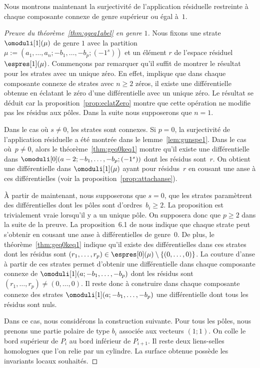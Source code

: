 Nous montrons maintenant la surjectivité de l'application résiduelle restreinte à chaque composante connexe de genre supérieur ou égal à~$1$.
\begin{proof}[Preuve du théorème~\ref{thm:ggeq1abel} en genre $1$]
Nous fixons une strate $\omoduli[1](\mu)$ de genre $1$ avec la partition $\mu:=(a_{1},\dots,a_{n};-b_{1},\dots,-b_{p};(-1^{s}))$ et un élément $r$ de l'espace résiduel $\espres[1](\mu)$.
Commençons par remarquer qu'il suffit de montrer le résultat pour les strates avec un unique zéro. En effet, \cite[Prop.\,7.1]{Bo} implique que dans chaque composante connexe de strates avec $n\geq2$ zéros, il existe une différentielle obtenue en éclatant le zéro d'une différentielle avec un unique zéro. Le résultat se déduit car la proposition~\ref{prop:eclatZero} montre que cette opération ne modifie pas les résidus aux pôles. Dans la suite nous supposerons que $n=1$.

Dans le cas où $s\neq0$, les strates sont connexes. Si $p = 0$, la surjectivité de l'application résiduelle a été montrée dans le lemme~\ref{lem:gunspe1}.
Dans le cas où~$p\neq0$, alors le théorème~\ref{thm:geq0keq1} montre qu'il existe une différentielle dans $\omoduli[0](a-2;-b_{1},\dots,-b_{p};(-1^{s}))$ dont les résidus sont~$r$. On obtient une différentielle dans $\omoduli[1](\mu)$ ayant pour résidus~$r$ en cousant une anse à ces différentielles (voir la proposition~\ref{prop:attachanse}).

À partir de maintenant, nous supposerons que $s=0$, \ie que les strates paramètrent des différentielles dont les pôles sont d'ordres~$b_{i}\geq 2$. La proposition est trivialement vraie lorsqu'il y a un unique pôle. On supposera donc que $p\geq2$ dans la suite de la preuve. La proposition~6.1 de \cite{Bo} nous indique que chaque strate peut s'obtenir en cousant une anse à différentielles de genre~$0$. De plus, le théorème~\ref{thm:geq0keq1} indique qu'il existe des différentielles dans ces strates dont les résidus sont $(r_{1},\dots,r_{p})\in \espres[0](\mu)\setminus\left\{(0,\dots,0)\right\}$. La couture d'anse à partir de ces strates permet d'obtenir une différentielle dans chaque composante connexe de $\omoduli[1](a;-b_{1},\dots,-b_{p})$ dont les résidus sont $(r_{1},\dots,r_{p}) \neq (0,\dots,0)$. Il reste donc à construire dans chaque composante connexe des strates $\omoduli[1](a;-b_{1},\dots,-b_{p})$ une différentielle dont tous les résidus sont nuls.

Dans ce cas, nous considérons la construction suivante. Pour tous les pôles, nous prenons une partie polaire de type $b_{i}$ associée aux vecteurs $(1;1)$. On colle le bord supérieur de $P_{i}$ au bord inférieur de $P_{i+1}$.
Il reste deux liens-selles homologues que l'on relie par un cylindre. La surface obtenue possède les invariants locaux souhaités.


\end{proof}
